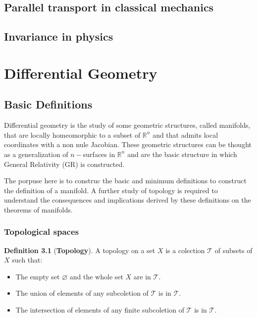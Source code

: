 \documentclass[10pt, letterpaper, oneside]{book}
\theoremstyle{theorem} %
\newtheorem{theorem}{Theorem}%
\theoremstyle{theorem} %
\theoremstyle{definition}
\newtheorem{definition}{Definition}%
\theoremstyle{remark}
\theoremstyle{definition}
\newtheorem{example}{Example}%
\theoremstyle{definition}
\theoremstyle{theorem}
\def\Re{\mathbb{R}}
\def\be{\begin{equation}}
\def\ee{\end{equation}}
\def\bth{\begin{theorem}}
\def\eth{\end{theorem}}
\def\bde{\begin{definition}}
\def\ede{\end{definition}}
\def\bex{\begin{example}}
\def\eex{\end{example}}
\begin{document}
\section{Parallel transport in classical mechanics}

\section{Invariance in physics}

\chapter{Differential Geometry}

\section{Basic Definitions}
%
%
%
%
Differential geometry is the study of some geometric structures, called manifolds, that are locally homeomorphic to a subset of $\Re^n$ and that admits local coordinates with a non nule Jacobian. These geometric structures can be thought as a generalization of $n-$surfaces in $\Re^n$ and are the basic structure in which General Relativity (GR) is constructed.

The porpuse here is to construc the basic and minimum definitions to construct the definition of a manifold. A further study of topology is required to understand the consequences and implications derived by these definitions on the theorems of manifolds.

\subsection*{Topological spaces}

\bde[\bf Topology]
A topology on a set $X$ is a colection $\mathscr{T}$ of subsets of $X$ such that:
\begin{itemize}
	\item[(a)] The empty set $\varnothing$ and the whole set $X$ are in $\mathscr{T}$.
	\item[(b)] The union of elements of any subcoletion of $\mathscr{T}$ is in $\mathscr{T}$.
	\item[(c)] The intersection of elements of any finite subcoletion of $\mathscr{T}$ is in $\mathscr{T}$.
\end{itemize} 
\ede
\end{document}
